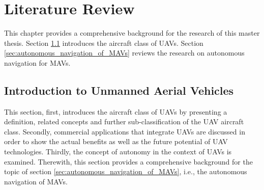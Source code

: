 
\chapter{Literature Review} \label{Chapter2}

This chapter provides a comprehensive background for the research of this master thesis.
Section \ref{sec:introduction_to_MAVs} introduces the aircraft class of UAVs.
Section \ref{sec:autonomous_navigation_of_MAVs} reviews the research on autonomous navigation for MAVs.




\section{Introduction to Unmanned Aerial Vehicles}       \label{sec:introduction_to_MAVs}%

This section, first, introduces the aircraft class of UAVs
by presenting a definition, related concepts and further sub-classification of the UAV aircraft class.
Secondly, commercial applications that integrate UAVs are discussed
in order to show the actual benefits as well as the future potential of UAV technologies.
Thirdly, the concept of autonomy in the context of UAVs is examined.
Therewith, this section provides a comprehensive background for the topic of section \ref{sec:autonomous_navigation_of_MAVs},
i.e., the autonomous navigation of MAVs.

